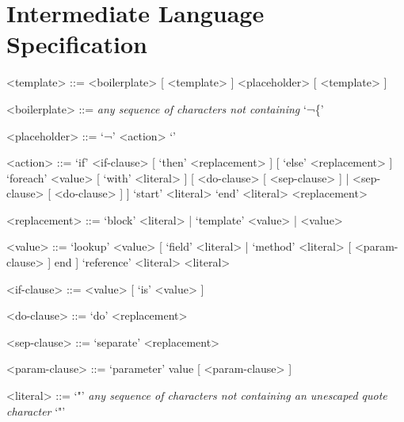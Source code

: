 \chapter{Intermediate Language Specification}
\label{appendix:bnf initial}

\setlength{\grammarindent}{4em} %
\begin{grammar}

<template> ::= <boilerplate> [ <template> ] \alt <placeholder> [ <template> ]

<boilerplate> ::= \emph{any sequence of characters not containing} `¬\{'

<placeholder> ::= `¬{' <action> `}'

<action> ::= `if' <if-clause> [ `then' <replacement> ] [ `else' <replacement> ]
\alt `foreach' <value>  [ `with' <literal> ] [ <do-clause> [ <sep-clause> ] | <sep-clause> [ <do-clause> ] ]
\alt `start' <literal>
\alt `end' <literal>
\alt <replacement>

<replacement> ::= `block' <literal> | `template' <value> | <value>

<value> ::= `lookup' <value> [ `field' <literal> | `method' <literal> [ <param-clause> ] end ]
\alt `reference' <literal>
\alt <literal>

<if-clause> ::= <value> [ `is' <value> ]

<do-clause> ::= `do' <replacement>

<sep-clause> ::= `separate' <replacement>

<param-clause> ::= `parameter' value [ <param-clause> ] 

<literal> ::= `"' \emph{any sequence of characters not containing an unescaped quote character} `"' 

\end{grammar}

